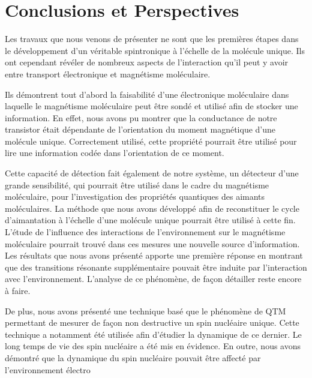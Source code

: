 \chapter*{Conclusions et Perspectives}

Les travaux que nous venons de présenter ne sont que les premières étapes dans le développement d'un véritable spintronique à l'échelle de la molécule unique. Ils ont cependant révéler de nombreux aspects de l'interaction qu'il peut y avoir entre transport électronique et magnétisme moléculaire.

Ils démontrent tout d'abord la faisabilité d'une électronique moléculaire dans laquelle le magnétisme moléculaire peut être sondé et utilisé afin de stocker une information. En effet, nous avons pu montrer que la conductance de notre transistor était dépendante de l'orientation du moment magnétique d'une molécule unique. Correctement utilisé, cette propriété pourrait être utilisé pour lire une information codée dans l'orientation de ce moment. 

Cette capacité de détection fait également de notre système, un détecteur d'une grande sensibilité, qui pourrait être utilisé dans le cadre du magnétisme moléculaire, pour l'investigation des propriétés quantiques des aimants moléculaires. La méthode que nous avons développé afin de reconstituer le cycle d'aimantation à l'échelle d'une molécule unique pourrait être utilisé à cette fin. L'étude de l'influence des interactions de l'environnement sur le magnétisme moléculaire pourrait trouvé dans ces mesures une nouvelle source d'information. Les résultats que nous avons présenté apporte une première réponse en montrant que des transitions résonante supplémentaire pouvait être induite par l'interaction avec l'environnement. L'analyse de ce phénomène, de façon détailler reste encore à faire.

De plus, nous avons présenté une technique basé que le phénomène de QTM permettant de mesurer de façon non destructive un spin nucléaire unique. Cette technique a notamment été utilisée afin d'étudier la dynamique de ce dernier. Le long temps de vie des spin nucléaire a été mis en évidence. En outre, nous avons démontré que la dynamique du spin nucléaire pouvait être affecté par l’environnement électro
